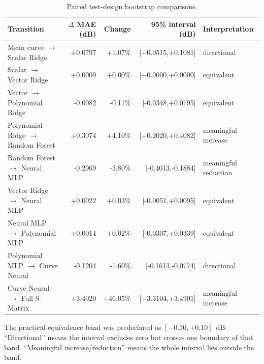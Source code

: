 \begin{table}[t]
    \caption{Paired test-design bootstrap comparisons.}
    \label{tab:appendix-bootstrap}
    \centering
    \scriptsize
    \begin{tabular}{@{}lrrrl@{}}
        \toprule
        Transition & $\Delta$ MAE (dB) & Change & 95\% interval (dB)
                   & Interpretation \\
        \midrule
        Mean curve $\rightarrow$ Scalar Ridge
          & +0.0797 & +1.07\% & [+0.0515,+0.1081] & directional \\
        Scalar $\rightarrow$ Vector Ridge
          & +0.0000 & +0.00\% & [+0.0000,+0.0000] & equivalent \\
        Vector $\rightarrow$ Polynomial Ridge
          & -0.0082 & -0.11\% & [-0.0348,+0.0195] & equivalent \\
        Polynomial Ridge $\rightarrow$ Random Forest
          & +0.3074 & +4.10\% & [+0.2020,+0.4082] & meaningful increase \\
        Random Forest $\rightarrow$ Neural MLP
          & -0.2969 & -3.80\% & [-0.4013,-0.1884] & meaningful reduction \\
        Vector Ridge $\rightarrow$ Neural MLP
          & +0.0022 & +0.03\% & [-0.0051,+0.0095] & equivalent \\
        Neural MLP $\rightarrow$ Polynomial MLP
          & +0.0014 & +0.02\% & [-0.0307,+0.0339] & equivalent \\
        Polynomial MLP $\rightarrow$ Curve Neural
          & -0.1204 & -1.60\% & [-0.1613,-0.0774] & directional \\
        Curve Neural $\rightarrow$ Full S-Matrix
          & +3.4020 & +46.05\% & [+3.3104,+3.4901] & meaningful increase \\
        \bottomrule
    \end{tabular}
\end{table}

The practical-equivalence band was predeclared as $[-0.10,+0.10]$~dB.
``Directional'' means the interval excludes zero but crosses one boundary of
that band. ``Meaningful increase/reduction'' means the whole interval lies
outside the band.

